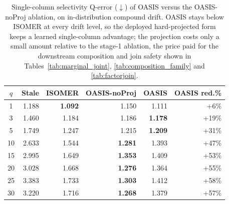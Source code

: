 \begin{table}[t]
  \centering
  \small
  \caption{Single-column selectivity Q-error ($\downarrow$) of OASIS versus the OASIS-noProj ablation, on in-distribution compound drift. OASIS stays below ISOMER at every drift level, so the deployed hard-projected form keeps a learned single-column advantage; the projection costs only a small amount relative to the stage-1 ablation, the price paid for the downstream composition and join safety shown in Tables~\ref{tab:marginal_joint}, \ref{tab:composition_family} and \ref{tab:factorjoin}.}
  \label{tab:single_column_projection}
  \setlength{\tabcolsep}{5pt}
  \begin{tabular}{c | rrr r | r}
    \toprule
    $q$ & Stale & ISOMER & OASIS-noProj & OASIS & OASIS red.\% \\
    \midrule
     1 & 1.188 & \textbf{1.092} & 1.150 & 1.111 & +6\% \\
     3 & 1.460 & 1.184 & 1.186 & \textbf{1.178} & +19\% \\
     5 & 1.749 & 1.247 & 1.215 & \textbf{1.209} & +31\% \\
    10 & 2.633 & 1.544 & \textbf{1.281} & 1.393 & +47\% \\
    15 & 2.995 & 1.649 & \textbf{1.353} & 1.409 & +53\% \\
    20 & 3.028 & 1.668 & \textbf{1.276} & 1.364 & +55\% \\
    25 & 3.383 & 1.733 & \textbf{1.303} & 1.412 & +58\% \\
    30 & 3.220 & 1.716 & \textbf{1.268} & 1.379 & +57\% \\
    \bottomrule
  \end{tabular}
\end{table}
